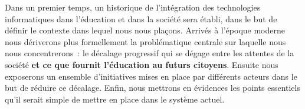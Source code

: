Dans un premier temps, un historique de l'intégration des technologies informatiques dans l'éducation et dans la société sera établi, dans le but de définir le contexte dans lequel nous nous plaçons. Arrivés à l'époque moderne nous dériverons plus formellement la problématique centrale sur laquelle nous nous concentrerons~: le décalage progressif qui se dégage entre les attentes de la société \textbf{et ce que fournit l'éducation au futurs citoyens}. Ensuite nous exposerons un ensemble d'initiatives mises en place par différents acteurs dans le but de réduire ce décalage. Enfin, nous mettrons en évidences les points essentiels qu'il serait simple de mettre en place dans le système actuel.